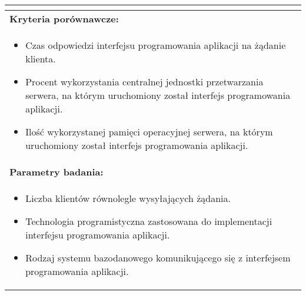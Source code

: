 \begin{longtable}[c]{|llll|}
{\begin{itemize}[label={}]
          \end{itemize}
    }                                                           \\ \hline
    \multicolumn{4}{|l|}{\textbf{Kryteria porównawcze:}}                             \\ \hline
    \multicolumn{4}{|p{\linewidth}|}{
        \begin{itemize}
            \item Czas odpowiedzi interfejsu programowania aplikacji na żądanie klienta.
            \item Procent wykorzystania centralnej jednostki przetwarzania serwera, na którym uruchomiony został interfejs programowania aplikacji.
            \item Ilość wykorzystanej pamięci operacyjnej serwera, na którym uruchomiony został interfejs programowania aplikacji.
        \end{itemize}
    }                                                           \\ \hline
    \multicolumn{4}{|l|}{\textbf{Parametry badania:}}                                \\ \hline
    \multicolumn{4}{|p{\linewidth}|}{
        \begin{itemize}
            \item Liczba klientów równolegle wysyłających żądania.
            \item Technologia programistyczna zastosowana do implementacji interfejsu programowania aplikacji.
            \item Rodzaj systemu bazodanowego komunikującego się z interfejsem programowania aplikacji.
        \end{itemize}
    }                                                           \\ \hline
\end{longtable}


